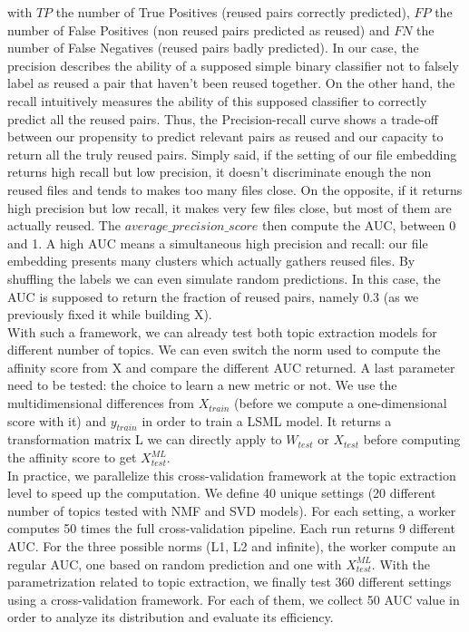 \documentclass[a4paper]{article}
\begin{document}
	with $TP$ the number of True Positives (reused pairs correctly predicted), $FP$ the number of False Positives (non reused pairs predicted as reused) and $FN$ the number of False Negatives (reused pairs badly predicted). In our case, the precision describes the ability of a supposed simple binary classifier not to falsely label as reused a pair that haven't been reused together. On the other hand, the recall intuitively measures the ability of this supposed classifier to correctly predict all the reused pairs. Thus, the Precision-recall curve shows a trade-off between our propensity to predict relevant pairs as reused and our capacity to return all the truly reused pairs. Simply said, if the setting of our file embedding returns high recall but low precision, it doesn't discriminate enough the non reused files and tends to makes too many files close. On the opposite, if it returns high precision but low recall, it makes very few files close, but most of them are actually reused. The \emph{$average\_precision\_score$} then compute the \ac{AUC}, between 0 and 1. A high \ac{AUC} means a simultaneous high precision and recall: our file embedding presents many clusters which actually gathers reused files. By shuffling the labels we can even simulate random predictions. In this case, the \ac{AUC} is supposed to return the fraction of reused pairs, namely 0.3 (as we previously fixed it while building X).\\
		
	With such a framework, we can already test both topic extraction models for different number of topics. We can even switch the norm used to compute the affinity score from X and compare the different \ac{AUC} returned. A last parameter need to be tested: the choice to learn a new metric or not. We use the multidimensional differences from $X_{train}$ (before we compute a one-dimensional score with it) and $y_{train}$ in order to train a \ac{LSML} model. It returns a transformation matrix L we can directly apply to $W_{test}$ or $X_{test}$ before computing the affinity score to get $X_{test}^{ML}$.\\
	
	In practice, we parallelize this cross-validation framework at the topic extraction level to speed up the computation. We define 40 unique settings (20 different number of topics tested with \ac{NMF} and \ac{SVD} models). For each setting, a worker computes 50 times the full cross-validation pipeline. Each run returns 9 different \ac{AUC}. For the three possible norms (L1, L2 and infinite), the worker compute an regular \ac{AUC}, one based on random prediction and one with $X_{test}^{ML}$. With the parametrization related to topic extraction, we finally test 360 different settings using a cross-validation framework. For each of them, we collect 50 \ac{AUC} value in order to analyze its distribution and evaluate its efficiency.
	
\end{document}
